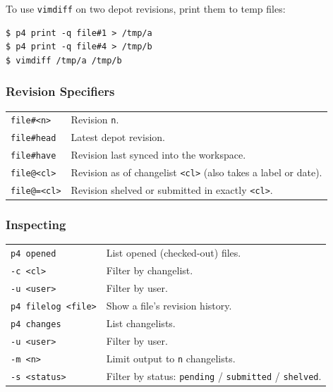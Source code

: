 To use \texttt{vimdiff} on two depot revisions, print them to
temp files:

\begin{mdframed}[backgroundcolor=gray!10,linecolor=Firebrick4]
\begin{verbatim}
$ p4 print -q file#1 > /tmp/a
$ p4 print -q file#4 > /tmp/b
$ vimdiff /tmp/a /tmp/b
\end{verbatim}
\end{mdframed}


\subsubsection*{Revision Specifiers}

\begin{tabularx}{\linewidth}{lX}
    \texttt{file\#<n>}  & Revision \texttt{n}.\\
    \texttt{file\#head} & Latest depot revision.\\
    \texttt{file\#have} & Revision last synced into the
                            workspace.\\
    \texttt{file@<cl>}  & Revision as of changelist \texttt{<cl>}
                            (also takes a label or date).\\
    \texttt{file@=<cl>} & Revision shelved or submitted in exactly
                            \texttt{<cl>}.\\
\hline
\end{tabularx}


\subsubsection*{Inspecting}

\begin{tabularx}{\linewidth}{lX}
    \texttt{p4 opened}
                & List opened (checked-out) files.\\
    \texttt{-c <cl>}   & Filter by changelist.\\
    \texttt{-u <user>} & Filter by user.\\
\hline
    \texttt{p4 filelog <file>}
                & Show a file's revision history.\\
\hline
    \texttt{p4 changes}
                & List changelists.\\
    \texttt{-u <user>}   & Filter by user.\\
    \texttt{-m <n>}      & Limit output to \texttt{n} changelists.\\
    \texttt{-s <status>} & Filter by status: \texttt{pending} /
                             \texttt{submitted} /
                             \texttt{shelved}.\\
\hline
\end{tabularx}
